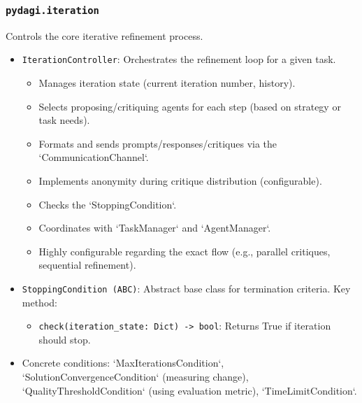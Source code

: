 \documentclass[12pt]{amsart}
\begin{document}
\subsubsection{\texttt{pydagi.iteration}}
Controls the core iterative refinement process.
\begin{itemize}[leftmargin=*]
    \item \texttt{IterationController}: Orchestrates the refinement loop for a given task.
        \begin{itemize}
            \item Manages iteration state (current iteration number, history).
            \item Selects proposing/critiquing agents for each step (based on strategy or task needs).
            \item Formats and sends prompts/responses/critiques via the `CommunicationChannel`.
            \item Implements anonymity during critique distribution (configurable).
            \item Checks the `StoppingCondition`.
            \item Coordinates with `TaskManager` and `AgentManager`.
            \item Highly configurable regarding the exact flow (e.g., parallel critiques, sequential refinement).
        \end{itemize}
    \item \texttt{StoppingCondition (ABC)}: Abstract base class for termination criteria. Key method:
        \begin{itemize}
            \item \texttt{check(iteration_state: Dict) -> bool}: Returns True if iteration should stop.
        \end{itemize}
    \item Concrete conditions: `MaxIterationsCondition`, `SolutionConvergenceCondition` (measuring change), `QualityThresholdCondition` (using evaluation metric), `TimeLimitCondition`.
\end{itemize}
\end{document}
